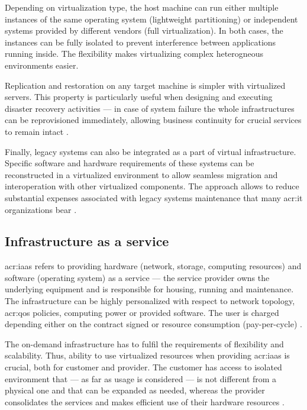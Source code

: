 \documentclass[11pt,openany]{book}
\begin{document}
        Depending on virtualization type, the host machine can run either multiple instances of the same operating
        system (lightweight partitioning) or independent systems provided by different vendors (full virtualization).
        In both cases, the instances can be fully isolated to prevent interference between applications running inside.
        The flexibility makes virtualizing complex heterogneous environments easier.

        Replication and restoration on any target machine is simpler with virtualized servers. This property is
        particularly useful when designing and executing disaster recovery activities --- in case of system failure the
        whole infrastructures can be reprovisioned immediately, allowing business continuity for crucial services to
        remain intact \cite{vib}.

        Finally, legacy systems can also be integrated as a part of virtual infrastructure. Specific software and
        hardware requirements of these systems can be reconstructed in a virtualized environment to allow seamless
        migration and interoperation with other virtualized components. The approach allows to reduce substantial
        expenses associated with legacy systems maintenance that many \gls{acr:it} organizations bear \cite{boers}.


      \subsection{Infrastructure as a service}

        \gls{acr:iaas} refers to providing hardware (network, storage, computing resources) and software (operating
        system) as a service --- the service provider owns the underlying equipment and is responsible for housing,
        running and maintenance. The infrastructure can be highly personalized with respect to network topology,
        \gls{acr:qos} policies, computing power or provided software. The user is charged depending either on the
        contract signed or resource consumption (pay-per-cycle) \cite{iaas}.

        The on-demand infrastructure has to fulfil the requirements of flexibility and scalability. Thus, ability to use
        virtualized resources when providing \gls{acr:iaas} is crucial, both for customer and provider. The customer has
        access to isolated environment that --- as far as usage is considered --- is not different from a physical one
        and that can be expanded as needed, whereas the provider consolidates the services and makes efficient use of
        their hardware resources \cite{iaas}.
\end{document}
